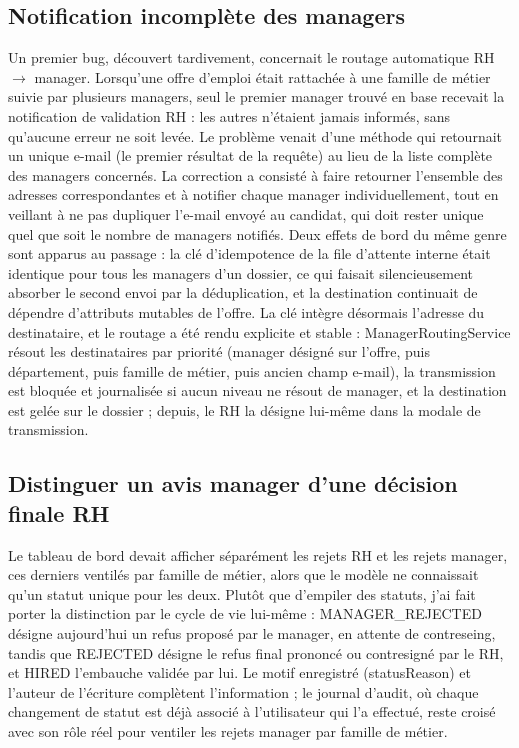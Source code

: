\subsection{Notification incomplète des managers}
\label{sec_4_5_1}
Un premier bug, découvert tardivement, concernait le routage automatique RH $\rightarrow$ manager. Lorsqu’une offre d’emploi était rattachée à une famille de métier suivie par plusieurs managers, seul le premier manager trouvé en base recevait la notification de validation RH : les autres n’étaient jamais informés, sans qu’aucune erreur ne soit levée. Le problème venait d’une méthode qui retournait un unique e-mail (le premier résultat de la requête) au lieu de la liste complète des managers concernés. La correction a consisté à faire retourner l’ensemble des adresses correspondantes et à notifier chaque manager individuellement, tout en veillant à ne pas dupliquer l’e-mail envoyé au candidat, qui doit rester unique quel que soit le nombre de managers notifiés. Deux effets de bord du même genre sont apparus au passage : la clé d’idempotence de la file d’attente interne était identique pour tous les managers d’un dossier, ce qui faisait silencieusement absorber le second envoi par la déduplication, et la destination continuait de dépendre d’attributs mutables de l’offre. La clé intègre désormais l’adresse du destinataire, et le routage a été rendu explicite et stable : Manager\-Routing\-Service résout les destinataires par priorité (manager désigné sur l’offre, puis département, puis famille de métier, puis ancien champ e-mail), la transmission est bloquée et journalisée si aucun niveau ne résout de manager, et la destination est gelée sur le dossier ; depuis, le RH la désigne lui-même dans la modale de transmission.

\subsection{Distinguer un avis manager d’une décision finale RH}
\label{sec_4_5_2}
Le tableau de bord devait afficher séparément les rejets RH et les rejets manager, ces derniers ventilés par famille de métier, alors que le modèle ne connaissait qu’un statut unique pour les deux. Plutôt que d’empiler des statuts, j’ai fait porter la distinction par le cycle de vie lui-même : MANAGER\_REJECTED désigne aujourd’hui un refus proposé par le manager, en attente de contreseing, tandis que REJECTED désigne le refus final prononcé ou contresigné par le RH, et HIRED l’embauche validée par lui. Le motif enregistré (statusReason) et l’auteur de l’écriture complètent l’information ; le journal d’audit, où chaque changement de statut est déjà associé à l’utilisateur qui l’a effectué, reste croisé avec son rôle réel pour ventiler les rejets manager par famille de métier.

